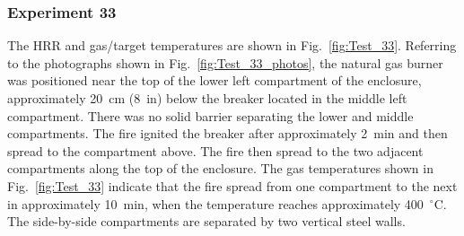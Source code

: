 \clearpage

\subsubsection{Experiment 33}

The HRR and gas/target temperatures are shown in Fig.~\ref{fig:Test_33}. Referring to the photographs shown in Fig.~\ref{fig:Test_33_photos}, the natural gas burner was positioned near the top of the lower left compartment of the enclosure, approximately 20~cm (8~in) below the breaker located in the middle left compartment. There was no solid barrier separating the lower and middle compartments. The fire ignited the breaker after approximately 2~min and then spread to the compartment above. The fire then spread to the two adjacent compartments along the top of the enclosure. The gas temperatures shown in Fig.~\ref{fig:Test_33} indicate that the fire spread from one compartment to the next in approximately 10~min, when the temperature reaches approximately 400~$^\circ$C. The side-by-side compartments are separated by two vertical steel walls.

